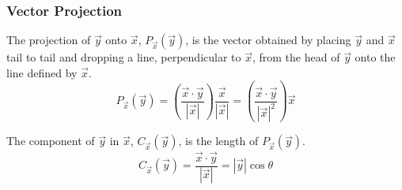 \documentclass{beamer}
\begin{document}
\begin{frame}
  \frametitle{Vector Projection}

The projection of $\vec{y}$ onto $\vec{x}$, $P_{\vec{x}}(\vec{y})$, is the vector obtained by placing $\vec{y}$ and $\vec{x}$ tail to tail and dropping a line, perpendicular to $\vec{x}$, from the head of $\vec{y}$ onto the line defined by $\vec{x}$.
\[
P_{\vec{x}}(\vec{y}) = \left(\frac{\vec{x} \cdot \vec{y}}{|\vec{x}|}\right) \frac{\vec{x}}{|\vec{x}|} = \left(\frac{\vec{x} \cdot \vec{y}}{|\vec{x}|^2}\right)\vec{x}
\]

The component of $\vec{y}$ in $\vec{x}$, $C_{\vec{x}}(\vec{y})$, is the length of $P_{\vec{x}}(\vec{y})$.
\[
C_{\vec{x}}(\vec{y}) = \frac{\vec{x} \cdot \vec{y}}{|\vec{x}|} = |\vec{y}|\cos \theta
\]

\begin{center}



\end{center}


\end{frame}
\end{document}
